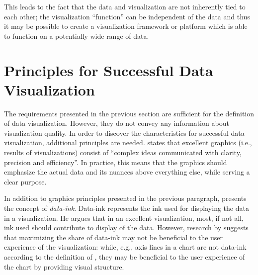 This leads to the fact that the data and visualization are not inherently tied to each other; the visualization ``function'' can be independent of the data and thus it may be possible to create a visualization framework or platform which is able to function on a potentially wide range of data.



\section{Principles for Successful Data Visualization}
\label{section:visualizationprinciples}

The requirements presented in the previous section are sufficient for the definition of data visualization. However, they do not convey any information about visualization quality. In order to discover the characteristics for successful data visualization, additional principles are needed. \citet[p.~13]{tufte_visual_1986} states that excellent graphics (i.e., results of visualizations) consist of ``complex ideas communicated with clarity, precision and efficiency''. In practice, this means that the graphics should emphasize the actual data and its nuances above everything else, while serving a clear purpose.

In addition to graphics principles presented in the previous paragraph, \citet[p.~93]{tufte_visual_1986} presents the concept of \emph{data-ink}. Data-ink represents the ink used for displaying the data in a visualization. He argues that in an excellent visualization, most, if not all, ink used should contribute to display of the data. However, research by \citet{inbar_minimalism_2007} suggests that maximizing the share of data-ink may not be beneficial to the user experience of the visualization: while, e.g., axis lines in a chart are not data-ink according to the definition of \citeauthor{tufte_visual_1986}, they may be beneficial to the user experience of the chart by providing visual structure.

